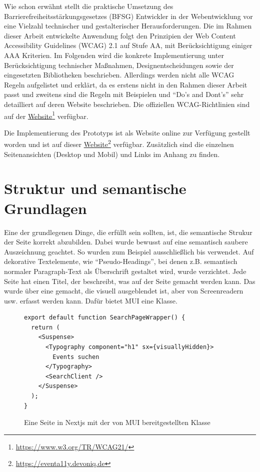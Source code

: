 Wie schon erwähnt stellt die praktische Umsetzung des Barrierefreiheitsstärkungsgesetzes (BFSG) Entwickler in der Webentwicklung vor eine  Vielzahl technischer und gestalterischer Herausforderungen. Die im Rahmen dieser Arbeit entwickelte Anwendung folgt den Prinzipien der Web Content Accessibility Guidelines (WCAG) 2.1 auf Stufe AA, mit Berücksichtigung einiger AAA Kriterien. Im Folgenden wird die konkrete Implementierung unter Berücksichtigung technischer Maßnahmen, Designentscheidungen sowie der eingesetzten Bibliotheken beschrieben. 
Allerdings werden nicht alle WCAG Regeln aufgelistet und erklärt, da es erstens nicht in den Rahmen dieser Arbeit passt und zweitens sind die Regeln mit Beispielen und \enquote{Do's and Dont's} sehr detailliert auf deren Website beschrieben.
Die offiziellen WCAG-Richtlinien sind auf der \href{https://www.w3.org/TR/WCAG21/}{Website}\footnote{\url{https://www.w3.org/TR/WCAG21/}} verfügbar.

Die Implementierung des Prototyps ist als Website online zur Verfügung gestellt worden und ist auf dieser \href{https://eventa11y.devoniq.de}{Website}{\footnote{\url{https://eventa11y.devoniq.de}}} verfügbar.
Zusätzlich sind die einzelnen Seitenansichten (Desktop und Mobil) und Links im Anhang zu finden.

\section{Struktur und semantische Grundlagen}
Eine der grundlegenen Dinge, die erfüllt sein sollten, ist, die semantische Strukur der Seite korrekt abzubilden. Dabei wurde bewusst auf eine semantisch saubere Auszeichnung geachtet. So wurden zum Beispiel ausschließlich  bis  verwendet. Auf dekorative Textelemente, wie \enquote{Pseudo-Headings}, bei denen z.B. semantisch normaler Paragraph-Text als Überschrift gestaltet wird, wurde verzichtet.
Jede Seite hat einen Titel, der beschreibt, was auf der Seite gemacht werden kann. Das wurde über eine  gemacht, die visuell ausgeblendet ist, aber von Screenreadern usw. erfasst werden kann. Dafür bietet MUI eine  Klasse.

\begin{figure}[H]
\begin{verbatim}
export default function SearchPageWrapper() {
  return (
    <Suspense>
      <Typography component="h1" sx={visuallyHidden}>
        Events suchen
      </Typography>
      <SearchClient />
    </Suspense>
  );
}
\end{verbatim}
\caption{Eine Seite in Nextjs mit der von MUI bereitgestellten  Klasse}
\end{figure}

